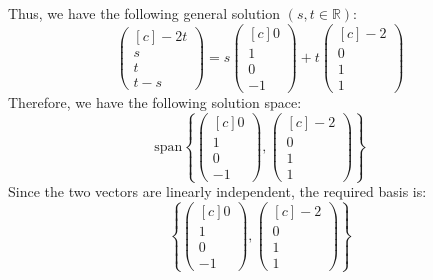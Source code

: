 \documentclass{article}
\begin{document}
Thus, we have the following general solution $(s, t \in \mathbb{R})$:
$$\begin{pmatrix}[c] -2t \\ s \\ t \\ t - s \end{pmatrix} = s\begin{pmatrix}[c] 0 \\ 1 \\ 0 \\ -1 \end{pmatrix} + t\begin{pmatrix}[c] -2 \\ 0 \\ 1 \\ 1 \end{pmatrix}$$ 
Therefore, we have the following solution space:
$$ \text{span} \left\{\begin{pmatrix}[c] 0 \\ 1 \\ 0 \\ -1 \end{pmatrix}, \begin{pmatrix}[c] -2 \\ 0 \\ 1 \\ 1 \end{pmatrix} \right\} $$
Since the two vectors are linearly independent, the required basis is:
$$\left\{\begin{pmatrix}[c] 0 \\ 1 \\ 0 \\ -1 \end{pmatrix}, \begin{pmatrix}[c] -2 \\ 0 \\ 1 \\ 1 \end{pmatrix}\right\} $$




\newpage
\end{document}
